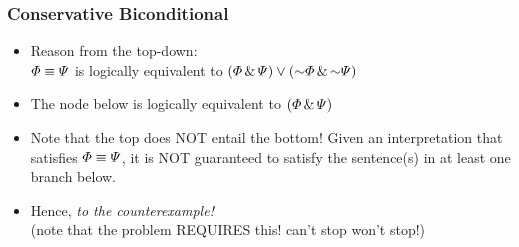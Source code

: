 \begin{frame}
\frametitle{Conservative Biconditional}

\begin{itemize}[<+->]

\item Reason from the top-down: \\ $\varPhi{}\equiv\varPsi{}$ is logically equivalent to $(\metaA{} \eand \metaB{}) \eor (\enot \metaA{} \eand \enot \metaB{})$ 

\item The node below is logically equivalent to $(\varPhi{} \,\&\, \varPsi{})$

\item Note that the top does NOT entail the bottom! Given an interpretation that satisfies  $\varPhi{}\equiv\varPsi{}$, it is NOT guaranteed to satisfy the sentence(s) in at least one branch below. 

\item Hence, \emph{to the counterexample!} \\ (note that the problem REQUIRES this! can't stop won't stop!) 





\end{itemize}
\end{frame}

